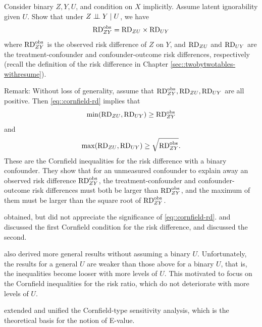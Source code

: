 \begin{HomeworkProblem}\label{exr:17-6}



Consider binary $Z, Y, U$, and condition on $X$ implicitly. Assume latent ignorability given $U$.  Show that under $Z\mathrel{\perp\!\!\!\perp} Y\mid U$, we have
\begin{eqnarray}
\text{RD}_{ZY}^{\textup{obs}} = \text{RD}_{ZU} \times \text{RD}_{UY}
\end{eqnarray}
where $\text{RD}_{ZY}^{\textup{obs}}$ is the observed risk difference of $Z$ on $Y$, and $\text{RD}_{ZU}$ and $ \text{RD}_{UY}$ are the treatment-confounder and confounder-outcome risk differences, respectively (recall the definition of the risk difference in Chapter \ref{sec::twobytwotables-withresume}).


Remark: Without loss of generality, assume that $\text{RD}_{ZY}^{\textup{obs}}, \text{RD}_{ZU} ,\text{RD}_{UY}$ are all positive. Then \eqref{eq::cornfield-rd} implies that
\[
\min(\text{RD}_{ZU}  , \text{RD}_{UY}) \geq \text{RD}_{ZY}^{\textup{obs}}
\]
and
\[
\max(\text{RD}_{ZU}  , \text{RD}_{UY}) \geq  \sqrt{ \text{RD}_{ZY}^{\textup{obs}}} .
\]
These are the Cornfield inequalities for the risk difference with a binary confounder.
They show that for an unmeasured confounder to explain away an observed risk difference $\text{RD}_{ZY}^{\textup{obs}}$, the treatment-confounder and confounder-outcome risk differences must both be larger than $\text{RD}_{ZY}^{\textup{obs}}$, and the maximum of them must be larger than the square root of $\text{RD}_{ZY}^{\textup{obs}}$.

\citet{Cornfield::1959} obtained, but did not appreciate the significance of \eqref{eq::cornfield-rd}. \citet{gastwirth1998cornfield} and \citet{poole2010origin} discussed the first Cornfield condition for the risk difference, and \citet{ding2014generalized} discussed the second.

\citet{ding2014generalized}  also derived more general results without assuming a binary $U$. Unfortunately, the results for a general $U$ are weaker than those above for a binary $U$, that is, the inequalities become looser with more levels of $U$. This motivated \citet{ding2016sensitivity} to focus on the Cornfield inequalities for the risk ratio, which do not deteriorate with more levels of $U$.




\end{HomeworkProblem}

\begin{HomeworkProblem}\label{exr:17-7}


\citet{ding2016sensitivity}  extended and unified the Cornfield-type sensitivity analysis, which is the theoretical basis for the notion of E-value.


\end{HomeworkProblem}
